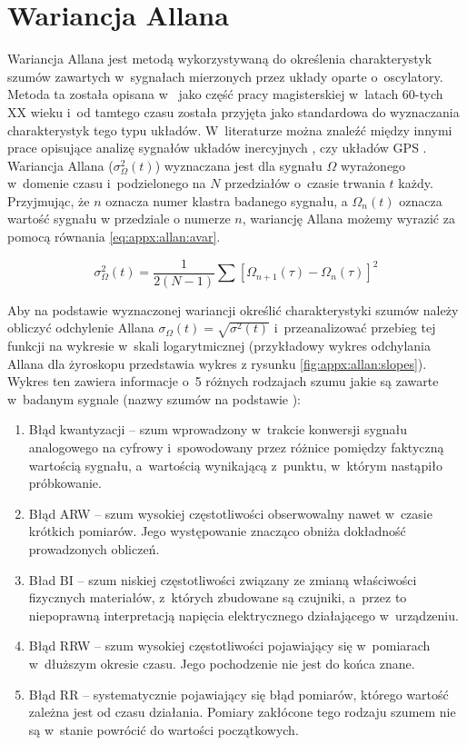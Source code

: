 \chapter{Wariancja Allana}\label{chap:appx:allan}
Wariancja Allana jest metodą wykorzystywaną do określenia charakterystyk szumów zawartych w~sygnałach mierzonych przez układy oparte o~oscylatory. Metoda ta została opisana w~\cite{Allan1966} jako część pracy magisterskiej w~latach 60-tych XX wieku i~od tamtego czasu została przyjęta jako standardowa do wyznaczania charakterystyk tego typu układów. W~literaturze można znaleźć między innymi prace opisujące analizę sygnałów układów inercyjnych \cite{El-Sheimy2008, FreescaleSemiconductor2015}, czy układów GPS \cite{Wright2007}. 
Wariancja Allana ($\sigma_{\Omega}^2(t)$) wyznaczana jest dla sygnału $\Omega$ wyrażonego w~domenie czasu i~podzielonego na $N$ przedziałów o~czasie trwania $t$ każdy. Przyjmując, że $n$ oznacza numer klastra badanego sygnału, a $\Omega_n(t)$ oznacza wartość sygnału w przedziale o numerze $n$, wariancję Allana możemy wyrazić za pomocą równania \ref{eq:appx:allan:avar}\cite{Sochocka2004}.

\begin{equation}
	\label{eq:appx:allan:avar}
	\sigma_{\Omega}^2(t) = \frac{1}{2(N-1)}\sum[\Omega_{n+1}(\tau)-\Omega_n(\tau)]^2
\end{equation}

		
Aby na podstawie wyznaczonej wariancji określić charakterystyki szumów należy obliczyć odchylenie Allana $\sigma_{\Omega}(t) = \sqrt{\sigma^2(t)}$ i~przeanalizować przebieg tej funkcji na wykresie w~skali logarytmicznej (przykładowy wykres odchylania Allana dla żyroskopu przedstawia wykres z rysunku \ref{fig:appx:allan:slopes}). Wykres ten zawiera informacje o~5 różnych rodzajach szumu jakie są zawarte w~badanym sygnale (nazwy szumów na podstawie \cite{PASZEK2016}):
		
\begin{enumerate}
	\item {Błąd kwantyzacji -- szum wprowadzony w~trakcie konwersji sygnału analogowego na cyfrowy i~spowodowany przez różnice pomiędzy faktyczną wartością sygnału, a~wartością wynikającą z~punktu, w~którym nastąpiło próbkowanie.}
	\item {Błąd ARW -- szum wysokiej częstotliwości obserwowalny nawet w~czasie krótkich pomiarów. Jego występowanie znacząco obniża dokładność prowadzonych obliczeń.}
	\item {Bład BI -- szum niskiej częstotliwości związany ze zmianą właściwości fizycznych materiałów, z~których zbudowane są czujniki, a~przez to niepoprawną interpretacją napięcia elektrycznego działającego w~urządzeniu.}
	\item {Błąd RRW -- szum wysokiej częstotliwości pojawiający się w~pomiarach w~dłuższym okresie czasu. Jego pochodzenie nie jest do końca znane.}
	\item {Błąd RR -- systematycznie pojawiający się błąd pomiarów, którego wartość zależna jest od czasu działania. Pomiary zakłócone tego rodzaju szumem nie są w~stanie powrócić do wartości początkowych.}	
\end{enumerate}
		
